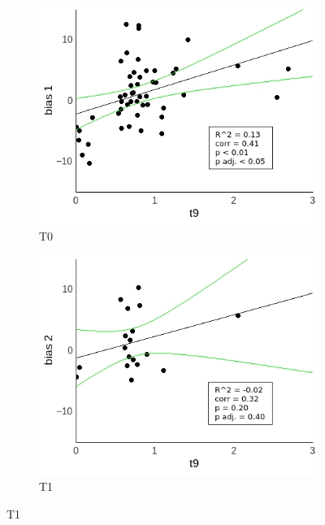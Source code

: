 \documentclass[a4paper]{scrreprt}
\begin{document}
\begin{figure}
\centering
\begin{subfigure}[b]{0.49\textwidth}
        \includegraphics[width=\textwidth]{figs/sec3/t9/t9_diff_1_mod2dat.jpeg}
        \caption{T0}
    \end{subfigure}
    \begin{subfigure}[b]{0.49\textwidth}
        \includegraphics[width=\textwidth]{figs/sec3/t9/t9_diff_2_mod2dat.jpeg}
        \caption{T1}
    \end{subfigure}


\end{figure}
\end{document}
